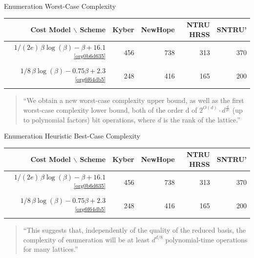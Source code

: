 \documentclass[xcolor=table,10pt,aspectratio=169]{beamer}
\def\enumworstfit{\(1/(2e)\, \beta \log(\beta) - \beta + 16.1\)}
\def\enumavgfit{\(1/8\,\beta \log(\beta) - 0.75\beta + 2.3\)}
\def\rogr{\rowcolor{gray!20}}
\begin{document}
\begin{frame}[label={sec:orgd103b51}]{Enumeration Worst-Case Complexity}
\begin{center}
\small{
\begin{tabular}{rrrrr}
\textbf{Cost Model} $\backslash$    \textbf{Scheme} & \textbf{Kyber} & \textbf{NewHope} & \textbf{NTRU HRSS} & \textbf{SNTRU'}\\
\hline
\rogr \enumworstfit \textsuperscript{\ref{org0b6d635}} & 456 & 738 & 313 & 370\\
\enumavgfit \textsuperscript{\ref{org6f64db5}} & 248 & 416 & 165 & 200\\
\end{tabular}
}
\end{center}

\begin{quote}
“We obtain a new worst-case complexity upper bound, as well as the first worst-case complexity lower
bound, both of the order d of \(2^{O(d)} \cdot d^{\frac{d}{2e}}\) (up to polynomial factors) bit
operations, where \(d\) is the rank of the lattice.” 
\end{quote}
\end{frame}

\begin{frame}[label={sec:org238fb6f}]{Enumeration Heuristic Best-Case Complexity}
\begin{center}
\small{
\begin{tabular}{rrrrr}
\textbf{Cost Model} $\backslash$    \textbf{Scheme} & \textbf{Kyber} & \textbf{NewHope} & \textbf{NTRU HRSS} & \textbf{SNTRU'}\\
\hline
\enumworstfit \textsuperscript{\ref{org0b6d635}} & 456 & 738 & 313 & 370\\
\rogr \enumavgfit \textsuperscript{\ref{org6f64db5}} & 248 & 416 & 165 & 200\\
\end{tabular}
}
\end{center}

\begin{quote}
“This suggests that, independently of the quality of the reduced basis, the complexity of enumeration will be at least \(d^{d/8}\) polynomial-time operations for many lattices.”
\end{quote}
\end{frame}
\end{document}
